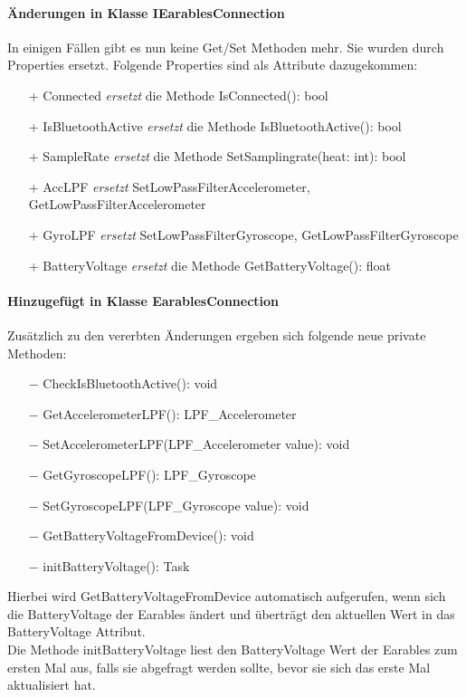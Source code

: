 \documentclass[a4paper,12pt]{article}
\begin{document}
\paragraph{Änderungen in Klasse IEarablesConnection}
In einigen Fällen gibt es nun keine Get/Set Methoden mehr. Sie wurden durch Properties ersetzt.
Folgende Properties sind als Attribute dazugekommen:
\begin{itemize}
	\item[+] Connected \textit{ersetzt } die Methode IsConnected(): bool
	\item[+] IsBluetoothActive  \textit{ersetzt } die Methode IsBluetoothActive(): bool
	\item[+] SampleRate  \textit{ersetzt } die Methode SetSamplingrate(heat: int): bool
	\item[+] AccLPF \textit{ersetzt} SetLowPassFilterAccelerometer, GetLowPassFilterAccelerometer
	\item[+] GyroLPF  \textit{ersetzt} SetLowPassFilterGyroscope, GetLowPassFilterGyroscope
	\item[+] BatteryVoltage  \textit{ersetzt } die Methode GetBatteryVoltage(): float
\end{itemize}

\paragraph{Hinzugefügt in Klasse EarablesConnection}
Zusätzlich zu den vererbten Änderungen ergeben sich folgende neue private Methoden:
\begin{itemize}
	\item[$-$] CheckIsBluetoothActive(): void
	\item[$-$] GetAccelerometerLPF(): LPF\_Accelerometer
	\item[$-$] SetAccelerometerLPF(LPF\_Accelerometer value): void
	\item[$-$] GetGyroscopeLPF(): LPF\_Gyroscope
	\item[$-$] SetGyroscopeLPF(LPF\_Gyroscope value): void
	\item[$-$] GetBatteryVoltageFromDevice(): void
	\item[$-$] initBatteryVoltage(): Task
\end{itemize}
  Hierbei wird GetBatteryVoltageFromDevice automatisch aufgerufen, wenn sich die BatteryVoltage der Earables ändert und überträgt den aktuellen Wert in das BatteryVoltage Attribut.\\
  Die Methode initBatteryVoltage liest den BatteryVoltage Wert der Earables zum ersten Mal aus, falls sie abgefragt werden sollte, bevor sie sich das erste Mal aktualisiert hat.
\end{document}
